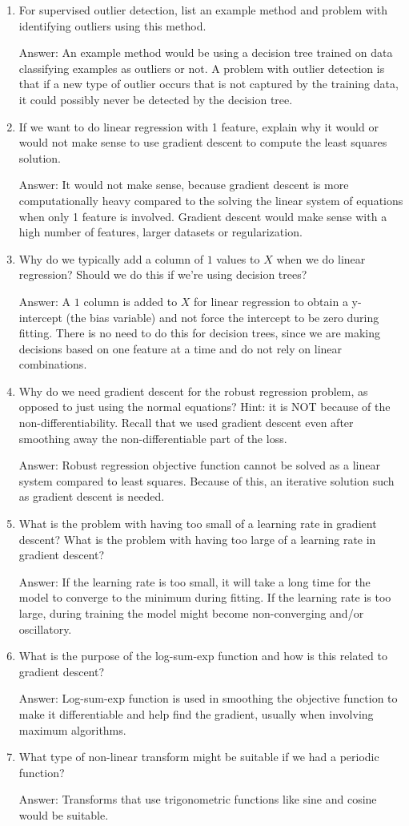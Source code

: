 \documentclass{article}
\newcommand{\gre}[1]{\textcolor{gre}{#1}}
\newcommand\ans[1]{\par\gre{Answer: #1}}
\begin{document}
\begin{enumerate}
\item For supervised outlier detection, list an example method and problem with identifying outliers using this method.
\ans{An example method would be using a decision tree trained on data classifying examples as outliers or not. A problem with outlier detection is that if a new type of outlier occurs that is not captured by the training data, it could possibly never be detected by the decision tree.}

\item If we want to do linear regression with 1 feature, explain why it would or would not make sense to use gradient descent to compute the least squares solution.
\ans{It would not make sense, because gradient descent is more computationally heavy compared to the solving the linear system of equations when only 1 feature is involved. Gradient descent would make sense with a high number of features, larger datasets or regularization.} 

\item Why do we typically add a column of $1$ values to $X$ when we do linear regression? Should we do this if we're using decision trees?
\ans{A $1$ column is added to $X$ for linear regression to obtain a y-intercept (the bias variable) and not force the intercept to be zero during fitting. There is no need to do this for decision trees, since we are making decisions based on one feature at a time and do not rely on linear combinations.}

\item Why do we need gradient descent for the robust regression problem, as opposed to just using the normal equations? Hint: it is NOT because of the non-differentiability. Recall that we used gradient descent even after smoothing away the non-differentiable part of the loss.
\ans{Robust regression objective function cannot be solved as a linear system compared to least squares. Because of this, an iterative solution such as gradient descent is needed. }

\item What is the problem with having too small of a learning rate in gradient descent? What is the problem with having too large of a learning rate in gradient descent?
\ans{If the learning rate is too small, it will take a long time for the model to converge to the minimum during fitting. If the learning rate is too large, during training the model might become non-converging and/or oscillatory. }

\item What is the purpose of the log-sum-exp function and how is this related to gradient descent?
\ans{Log-sum-exp function is used in smoothing the objective function to make it differentiable and help find the gradient, usually when involving maximum algorithms.}

\item What type of non-linear transform might be suitable if we had a periodic function?
\ans{Transforms that use trigonometric functions like sine and cosine would be suitable.}
\end{enumerate}
\end{document}
